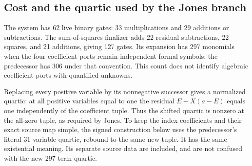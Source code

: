\subsection{Cost and the quartic used by the Jones branch}

The system has 62 live binary gates: 33 multiplications and 29 additions
or subtractions. The sum-of-squares finalizer adds 22 residual
subtractions, 22 squares, and 21 additions, giving 127 gates.
Its expansion has 297 monomials when the four coefficient ports remain
independent formal symbols; the predecessor has 306 under that convention.
This count does not identify algebraic coefficient ports with quantified
unknowns.

Replacing every positive variable by its nonnegative successor gives a
normalized quartic: at all positive variables equal to one the residual
$E-X(a-E)$ equals one independently of the coefficient tuple. Thus the
shifted quartic is nonzero at the all-zero tuple, as required by Jones.
To keep the index coefficients and their exact source map simple, the
signed construction below uses the predecessor's literal 31-variable
quartic, rebound to the same new tuple. It has the same existential
meaning. Its separate source data are included, and are not confused
with the new 297-term quartic.
